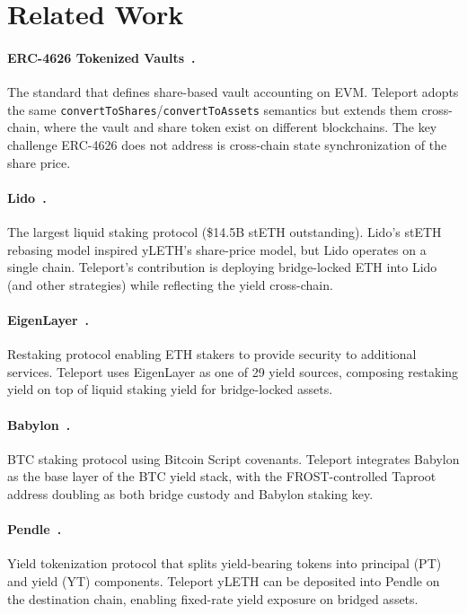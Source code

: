 \section{Related Work}
\label{sec:related}

\paragraph{ERC-4626 Tokenized Vaults~\cite{erc4626}.} The standard that defines share-based vault accounting on EVM. Teleport adopts the same \texttt{convertToShares}/\texttt{convertToAssets} semantics but extends them cross-chain, where the vault and share token exist on different blockchains. The key challenge ERC-4626 does not address is cross-chain state synchronization of the share price.

\paragraph{Lido~\cite{lidofinance}.} The largest liquid staking protocol (\$14.5B stETH outstanding). Lido's stETH rebasing model inspired yLETH's share-price model, but Lido operates on a single chain. Teleport's contribution is deploying bridge-locked ETH into Lido (and other strategies) while reflecting the yield cross-chain.

\paragraph{EigenLayer~\cite{eigenlayer2023}.} Restaking protocol enabling ETH stakers to provide security to additional services. Teleport uses EigenLayer as one of 29 yield sources, composing restaking yield on top of liquid staking yield for bridge-locked assets.

\paragraph{Babylon~\cite{babylon2024}.} BTC staking protocol using Bitcoin Script covenants. Teleport integrates Babylon as the base layer of the BTC yield stack, with the FROST-controlled Taproot address doubling as both bridge custody and Babylon staking key.

\paragraph{Pendle~\cite{pendle2023}.} Yield tokenization protocol that splits yield-bearing tokens into principal (PT) and yield (YT) components. Teleport yLETH can be deposited into Pendle on the destination chain, enabling fixed-rate yield exposure on bridged assets.

